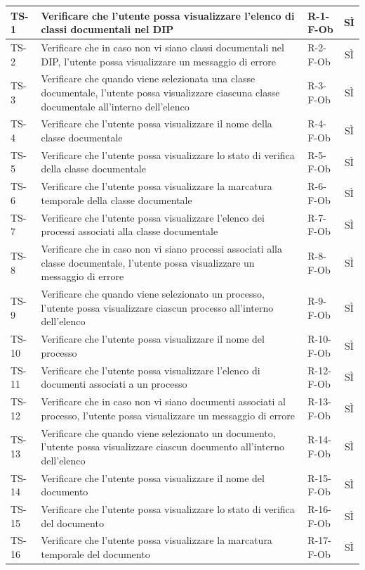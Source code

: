 \documentclass[a4paper,12pt]{article}
\begin{document}
\begin{longtable}{|p{1.5cm}|p{8.3cm}|p{2.4cm}|c|}
TS-1 & Verificare che l'utente possa visualizzare l'elenco di classi documentali nel DIP & R-1-F-Ob & SÌ \\
\hline
TS-2 & Verificare che in caso non vi siano classi documentali nel DIP, l'utente possa visualizzare un messaggio di errore & R-2-F-Ob & SÌ \\
\hline
TS-3 & Verificare che quando viene selezionata una classe documentale, l'utente possa visualizzare ciascuna classe documentale all'interno dell'elenco & R-3-F-Ob & SÌ \\
\hline
TS-4 & Verificare che l'utente possa visualizzare il nome della classe documentale & R-4-F-Ob & SÌ \\
\hline
TS-5 & Verificare che l'utente possa visualizzare lo stato di verifica della classe documentale & R-5-F-Ob & SÌ \\
\hline
TS-6 & Verificare che l'utente possa visualizzare la marcatura temporale della classe documentale & R-6-F-Ob & SÌ \\
\hline
TS-7 & Verificare che l'utente possa visualizzare l'elenco dei processi associati alla classe documentale & R-7-F-Ob & SÌ \\
\hline
TS-8 & Verificare che in caso non vi siano processi associati alla classe documentale, l'utente possa visualizzare un messaggio di errore & R-8-F-Ob & SÌ \\
\hline
TS-9 & Verificare che quando viene selezionato un processo, l'utente possa visualizzare ciascun processo all'interno dell'elenco & R-9-F-Ob & SÌ \\
\hline
TS-10 & Verificare che l'utente possa visualizzare il nome del processo & R-10-F-Ob & SÌ \\
\hline
TS-11 & Verificare che l'utente possa visualizzare l'elenco di documenti associati a un processo & R-12-F-Ob & SÌ \\
\hline
TS-12 & Verificare che in caso non vi siano documenti associati al processo, l'utente possa visualizzare un messaggio di errore & R-13-F-Ob & SÌ \\
\hline
TS-13 & Verificare che quando viene selezionato un documento, l'utente possa visualizzare ciascun documento all'interno dell'elenco & R-14-F-Ob & SÌ \\
\hline
TS-14 & Verificare che l'utente possa visualizzare il nome del documento & R-15-F-Ob & SÌ \\
\hline
TS-15 & Verificare che l'utente possa visualizzare lo stato di verifica del documento & R-16-F-Ob & SÌ \\
\hline
TS-16 & Verificare che l'utente possa visualizzare la marcatura temporale del documento & R-17-F-Ob & SÌ \\

\end{longtable}
\end{document}
